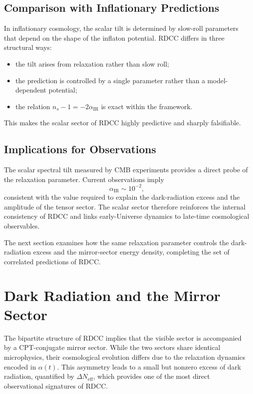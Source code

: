 \documentclass[11pt,a4paper]{article}
\begin{document}
\subsection{Comparison with Inflationary Predictions}

In inflationary cosmology, the scalar tilt is determined by slow-roll parameters that
depend on the shape of the inflaton potential. RDCC differs in three structural ways:
\begin{itemize}
    \item the tilt arises from relaxation rather than slow roll;
    \item the prediction is controlled by a single parameter rather than a model-dependent potential;
    \item the relation $n_s - 1 = -2\alpha_{\mathrm{IR}}$ is exact within the framework.
\end{itemize}
This makes the scalar sector of RDCC highly predictive and sharply falsifiable.

\subsection{Implications for Observations}

The scalar spectral tilt measured by CMB experiments provides a direct probe of the
relaxation parameter. Current observations imply
\begin{equation}
    \alpha_{\mathrm{IR}} \sim 10^{-2},
\end{equation}
consistent with the value required to explain the dark-radiation excess and the
amplitude of the tensor sector. The scalar sector therefore reinforces the internal
consistency of RDCC and links early-Universe dynamics to late-time cosmological
observables.

The next section examines how the same relaxation parameter controls the
dark-radiation excess and the mirror-sector energy density, completing the set of
correlated predictions of RDCC.

\section{Dark Radiation and the Mirror Sector}

The bipartite structure of RDCC implies that the visible sector is accompanied by a
CPT-conjugate mirror sector. While the two sectors share identical microphysics, their
cosmological evolution differs due to the relaxation dynamics encoded in $\alpha(t)$.
This asymmetry leads to a small but nonzero excess of dark radiation, quantified by
$\Delta N_{\mathrm{eff}}$, which provides one of the most direct observational signatures of
RDCC.
\end{document}
